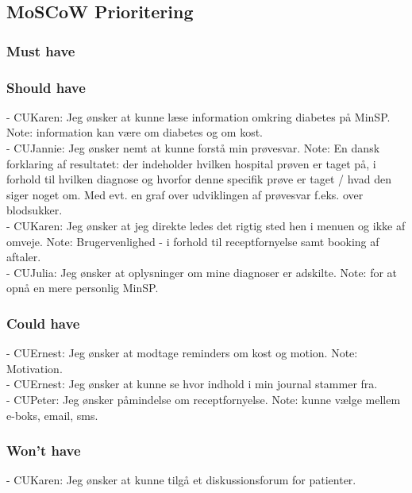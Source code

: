 \subsection{MoSCoW Prioritering}
\subsubsection*{Must have}
\subsubsection*{Should have}
%
- CUKaren: Jeg ønsker at kunne læse information omkring diabetes på MinSP. Note: information kan være om diabetes og om kost.\\ %
- CUJannie: Jeg ønsker nemt at kunne forstå min prøvesvar. Note: En dansk forklaring af resultatet: der indeholder hvilken hospital prøven er taget på, i forhold til hvilken diagnose og hvorfor denne specifik prøve er taget / hvad den siger noget om. Med evt. en graf over udviklingen af prøvesvar f.eks. over blodsukker.\\
- CUKaren: Jeg ønsker at jeg direkte ledes det rigtig sted hen i menuen og ikke af omveje. Note: Brugervenlighed - i forhold til receptfornyelse samt booking af aftaler.\\ 
- CUJulia: Jeg ønsker at oplysninger om mine diagnoser er adskilte. Note: for at opnå en mere personlig MinSP.\\
\subsubsection*{Could have}
- CUErnest: Jeg ønsker at modtage reminders om kost og motion. Note: Motivation. \\
- CUErnest: Jeg ønsker at kunne se hvor indhold i min journal stammer fra.\\
- CUPeter: Jeg ønsker påmindelse om receptfornyelse. Note: kunne vælge mellem e-boks, email, sms.\\
\subsubsection*{Won't have}
- CUKaren: Jeg ønsker at kunne tilgå et diskussionsforum for patienter.\\ %